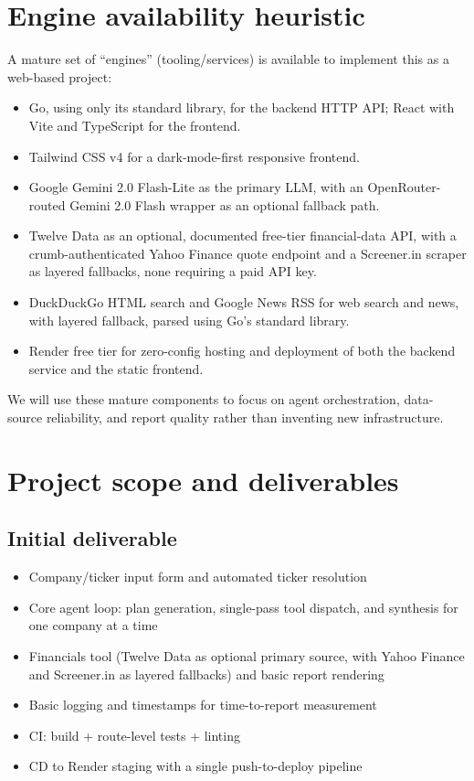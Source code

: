\documentclass[11pt,a4paper]{article}
\begin{document}
\section{Engine availability heuristic}
A mature set of ``engines'' (tooling/services) is available to implement this as a web-based project:
\begin{itemize}[leftmargin=0.7cm]
    \item Go, using only its standard library, for the backend HTTP API; React with Vite and TypeScript for the frontend.
    \item Tailwind CSS v4 for a dark-mode-first responsive frontend.
    \item Google Gemini 2.0 Flash-Lite as the primary LLM, with an OpenRouter-routed Gemini 2.0 Flash wrapper as an optional fallback path.
    \item Twelve Data as an optional, documented free-tier financial-data API, with a crumb-authenticated Yahoo Finance quote endpoint and a Screener.in scraper as layered fallbacks, none requiring a paid API key.
    \item DuckDuckGo HTML search and Google News RSS for web search and news, with layered fallback, parsed using Go's standard library.
    \item Render free tier for zero-config hosting and deployment of both the backend service and the static frontend.
\end{itemize}
We will use these mature components to focus on agent orchestration, data-source reliability, and report quality rather than inventing new infrastructure.

\section{Project scope and deliverables}
\subsection{Initial deliverable}
\begin{itemize}[leftmargin=0.7cm]
    \item Company/ticker input form and automated ticker resolution
    \item Core agent loop: plan generation, single-pass tool dispatch, and synthesis for one company at a time
    \item Financials tool (Twelve Data as optional primary source, with Yahoo Finance and Screener.in as layered fallbacks) and basic report rendering
    \item Basic logging and timestamps for time-to-report measurement
    \item CI: build + route-level tests + linting
    \item CD to Render staging with a single push-to-deploy pipeline
\end{itemize}
\end{document}
